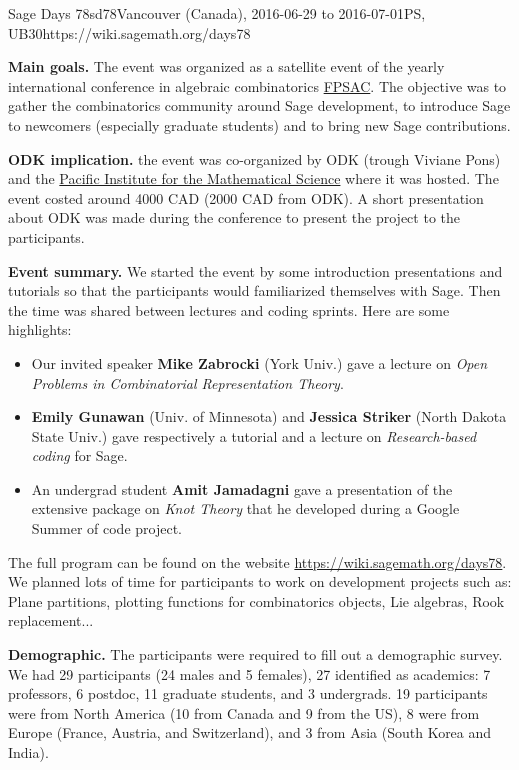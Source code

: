 \begin{event}{Sage Days 78}{sd78}{Vancouver (Canada), 2016-06-29 to 2016-07-01}{PS, UB}{30}{https://wiki.sagemath.org/days78}

\textbf{Main goals.} The event was organized as a satellite event of the yearly international conference
in algebraic combinatorics \href{https://sites.google.com/site/fpsac2016/}{FPSAC}. The objective was to gather
the combinatorics community around Sage development, to introduce Sage to newcomers (especially graduate students) and
to bring new Sage contributions.

\textbf{ODK implication.} the event was co-organized by ODK (trough Viviane Pons) and the 
\href{https://www.pims.math.ca/}{Pacific Institute for the Mathematical Science} where
it was hosted. The event costed around 4000 CAD (2000 CAD from ODK).
 A short presentation about ODK was made during the conference to present 
the project to the participants.

\textbf{Event summary.} We started the event by some introduction presentations and tutorials so that
the participants would familiarized themselves with Sage. Then the time was shared between lectures
and coding sprints. Here are some highlights:
\begin{itemize}
\item Our invited speaker \textbf{Mike Zabrocki} (York Univ.) gave a lecture on \emph{Open Problems in Combinatorial Representation Theory}.

\item \textbf{Emily Gunawan} (Univ. of Minnesota) and \textbf{Jessica Striker} (North Dakota State Univ.) gave respectively
a tutorial and a lecture on \emph{Research-based coding} for Sage.

\item An undergrad student \textbf{Amit Jamadagni} gave a presentation of the extensive package on \emph{Knot Theory} that
he developed during a Google Summer of code project.
\end{itemize}

The full program can be found on the website \url{https://wiki.sagemath.org/days78}. We planned lots of time for 
participants to work on development projects such as: Plane partitions, plotting functions for combinatorics
objects, Lie algebras, Rook replacement...

\textbf{Demographic.} The participants were required to fill out a demographic survey. We had 29 participants (24 males and
5 females), 27 identified as academics: 7 professors, 6 postdoc, 11 graduate students, and 3 undergrads. 19 participants
were from North America (10 from Canada and 9 from the US), 8 were from Europe (France, Austria, and Switzerland), and 3 from 
Asia (South Korea and India).


\end{event}
